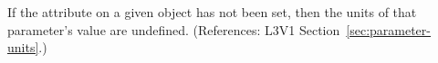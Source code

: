 If the  attribute on a given \Parameter object has not been
set, then the units of that parameter's value are undefined.  (References:
L3V1 Section~\ref{sec:parameter-units}.)

